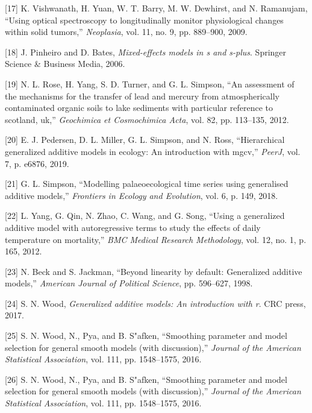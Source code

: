 \documentclass[
]{article}
\begin{document}
\leavevmode\hypertarget{ref-vishwanath2009}{}%
{[}17{]} K. Vishwanath, H. Yuan, W. T. Barry, M. W. Dewhirst, and N.
Ramanujam, ``Using optical spectroscopy to longitudinally monitor
physiological changes within solid tumors,'' \emph{Neoplasia}, vol. 11,
no. 9, pp. 889--900, 2009.

\leavevmode\hypertarget{ref-pinheiro2006}{}%
{[}18{]} J. Pinheiro and D. Bates, \emph{Mixed-effects models in s and
s-plus}. Springer Science \& Business Media, 2006.

\leavevmode\hypertarget{ref-rose2012}{}%
{[}19{]} N. L. Rose, H. Yang, S. D. Turner, and G. L. Simpson, ``An
assessment of the mechanisms for the transfer of lead and mercury from
atmospherically contaminated organic soils to lake sediments with
particular reference to scotland, uk,'' \emph{Geochimica et Cosmochimica
Acta}, vol. 82, pp. 113--135, 2012.

\leavevmode\hypertarget{ref-pedersen2019}{}%
{[}20{]} E. J. Pedersen, D. L. Miller, G. L. Simpson, and N. Ross,
``Hierarchical generalized additive models in ecology: An introduction
with mgcv,'' \emph{PeerJ}, vol. 7, p. e6876, 2019.

\leavevmode\hypertarget{ref-simpson2018}{}%
{[}21{]} G. L. Simpson, ``Modelling palaeoecological time series using
generalised additive models,'' \emph{Frontiers in Ecology and
Evolution}, vol. 6, p. 149, 2018.

\leavevmode\hypertarget{ref-yang2012}{}%
{[}22{]} L. Yang, G. Qin, N. Zhao, C. Wang, and G. Song, ``Using a
generalized additive model with autoregressive terms to study the
effects of daily temperature on mortality,'' \emph{BMC Medical Research
Methodology}, vol. 12, no. 1, p. 165, 2012.

\leavevmode\hypertarget{ref-beck1998}{}%
{[}23{]} N. Beck and S. Jackman, ``Beyond linearity by default:
Generalized additive models,'' \emph{American Journal of Political
Science}, pp. 596--627, 1998.

\leavevmode\hypertarget{ref-wood2017}{}%
{[}24{]} S. N. Wood, \emph{Generalized additive models: An introduction
with r}. CRC press, 2017.

\leavevmode\hypertarget{ref-wood2011}{}%
{[}25{]} S. N. Wood, N., Pya, and B. S"afken, ``Smoothing parameter and
model selection for general smooth models (with discussion),''
\emph{Journal of the American Statistical Association}, vol. 111, pp.
1548--1575, 2016.

\leavevmode\hypertarget{ref-wood2016}{}%
{[}26{]} S. N. Wood, N., Pya, and B. S"afken, ``Smoothing parameter and
model selection for general smooth models (with discussion),''
\emph{Journal of the American Statistical Association}, vol. 111, pp.
1548--1575, 2016.
\end{document}
